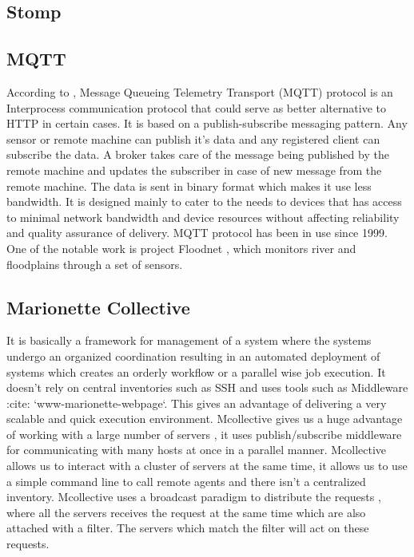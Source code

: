 \subsection{ Stomp}
\subsection{ MQTT}
     
     According to \cite{www-mqtt}, Message Queueing Telemetry
     Transport (MQTT) protocol is an Interprocess communication
     protocol that could serve as better alternative to HTTP in
     certain cases. It is based on a publish-subscribe messaging
     pattern. Any sensor or remote machine can publish it's data and
     any registered client can subscribe the data. A broker takes care
     of the message being published by the remote machine and updates
     the subscriber in case of new message from the remote
     machine. The data is sent in binary format which makes it use
     less bandwidth. It is designed mainly to cater to the needs to
     devices that has access to minimal network bandwidth and device
     resources without affecting reliability and quality assurance of
     delivery. MQTT protocol has been in use since 1999. One of the
     notable work is project Floodnet \cite{www-floodnet}, which
     monitors river and floodplains through a set of sensors.

\subsection{ Marionette Collective}

     It is basically a framework for management of a system where the
     systems undergo an organized coordination resulting in an
     automated deployment of systems which creates an orderly workflow
     or a parallel wise job execution. It doesn’t rely on central
     inventories such as SSH and uses tools such as Middleware :cite:
     `www-marionette-webpage`. This gives an advantage of delivering a
     very scalable and quick execution environment.  Mcollective gives
     us a huge advantage of working with a large number of servers ,
     it uses publish/subscribe middleware for communicating with many
     hosts at once in a parallel manner. Mcollective allows us to
     interact with a cluster of servers at the same time, it allows us
     to use a simple command line to call remote agents and there
     isn’t a centralized inventory. Mcollective uses a broadcast
     paradigm to distribute the requests , where all the servers
     receives the request at the same time which are also attached
     with a filter. The servers which match the filter will act on
     these requests.
     
